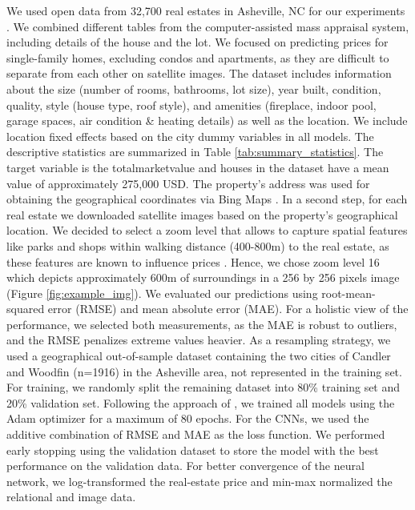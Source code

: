 \documentclass[letterpaper]{article} %
\begin{document}
We used open data from 32,700 real estates in Asheville, NC for our experiments \cite{Ashville_1}. We combined different tables from the computer-assisted mass appraisal system, including details of the house and the lot. We focused on predicting prices for single-family homes, excluding condos and apartments, as they are difficult to separate from each other on satellite images. The dataset includes information about the size (number of rooms, bathrooms, lot size), year built, condition, quality, style (house type, roof style), and amenities (fireplace, indoor pool, garage spaces, air condition \& heating details) as well as the location. We include location fixed effects based on the city dummy variables in all models. The descriptive statistics are summarized in Table \ref{tab:summary_statistics}. The target variable is the totalmarketvalue and houses in the dataset have a mean value of approximately 275,000 USD. The property's address was used for obtaining the geographical coordinates via Bing Maps \cite{Bing}. In a second step, for each real estate we downloaded satellite images based on the property's geographical location. We decided to select a zoom level that allows to capture spatial features like parks and shops within walking distance (400-800m) to the real estate, as these features are known to influence prices \cite{noor2015sustainable, law2019take}. Hence, we chose zoom level 16 which depicts approximately 600m of surroundings in a 256 by 256 pixels image (Figure \ref{fig:example_img}). We evaluated our predictions using root-mean-squared error (RMSE) and mean absolute error (MAE). For a holistic view of the performance, we selected both measurements, as the MAE is robust to outliers, and the RMSE penalizes extreme values heavier. As a resampling strategy, we used a geographical out-of-sample dataset containing the two cities of Candler and Woodfin (n=1916) in the Asheville area, not represented in the training set. For training, we randomly split the remaining dataset into 80\% training set and 20\% validation set. Following the approach of \citeauthor{law2019take} \citeyearpar{law2019take}, we trained all models using the Adam optimizer for a maximum of 80 epochs. For the CNNs, we used the additive combination of RMSE and MAE as the loss function. We performed early stopping using the validation dataset to store the model with the best performance on the validation data. For better convergence of the neural network, we log-transformed the real-estate price and min-max normalized the relational and image data.
\end{document}
